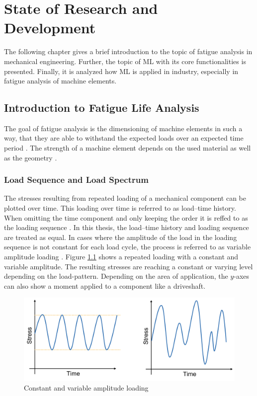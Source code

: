 \chapter{State of Research and Development}\label{chap2}
The following chapter gives a brief introduction to the topic of fatigue analysis in mechanical engineering. Further, the topic of ML with its core functionalities is presented. Finally, it is analyzed how ML is applied in industry, especially in fatigue analysis of machine elements.

\section{Introduction to Fatigue Life Analysis}
The goal of fatigue analysis is the dimensioning of machine elements in such a way, that they are able to withstand the expected loads over an expected time period \cite{Haibach}. The strength of a machine element depends on the used material as well as the geometry \cite{Wittel}.

\subsection{Load Sequence and Load Spectrum}
The stresses resulting from repeated loading of a mechanical component can be plotted over time. This loading over time is referred to as load–time history. When omitting the time component and only keeping the order it is reffed to as the loading sequence \cite{HEULER}. In this thesis, the load–time history and loading sequence are treated as equal. In cases where the amplitude of the load in the loading sequence is not constant for each load cycle, the process is referred to as variable amplitude loading \cite{Facchinetti}.
Figure \ref{fig:VAL} shows a repeated loading with a constant and variable amplitude.
The resulting stresses are reaching a constant or varying level depending on the load-pattern. Depending on the area of application, the \(y\)-axes can also show a moment applied to a component like a driveshaft. 

\begin{figure}[H]
	\centering
	\includegraphics[width=0.8\linewidth]{IMGs/loading.png}
	\caption{Constant and variable amplitude loading}
	\label{fig:VAL}
\end{figure}
 
